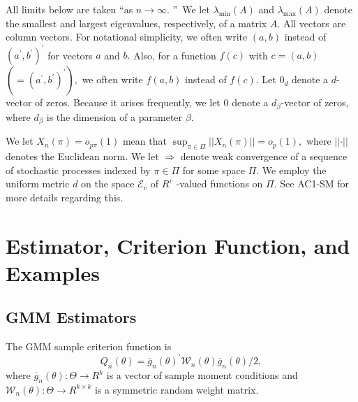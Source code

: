\documentclass[12pt,titlepage,final,oneside,letterpaper]{article}
\begin{document}
All limits below are taken \textquotedblleft as $n\rightarrow \infty .$%
\textquotedblright\ We let $\lambda _{\min }(A)$ and $\lambda _{\max }(A)$
denote the smallest and largest eigenvalues, respectively, of a matrix $A.$
All vectors are column vectors. For notational simplicity, we often write $%
(a,b)$ instead of $(a^{\prime },b^{\prime })^{\prime }$ for vectors $a$ and $%
b.$ Also, for a function $f(c)$ with $c=(a,b)$ $(=(a^{\prime },b^{\prime
})^{\prime }),$ we often write $f(a,b)$ instead of $f(c).$ Let $0_{d}$
denote a $d$-vector of zeros. Because it arises frequently, we let $0$
denote a $d_{\beta }$-vector of zeros, where $d_{\beta }$ is the dimension
of a parameter $\beta .$

We let $X_{n}(\pi )=o_{p\pi }(1)$ mean that $\sup_{\pi \in \Pi }\allowbreak
\left\vert \left\vert X_{n}(\pi )\right\vert \right\vert =o_{p}(1),$ where $%
\left\vert \left\vert \cdot \right\vert \right\vert $ denotes the Euclidean
norm. We let $\Rightarrow $ denote weak convergence of a sequence of
stochastic processes indexed by $\pi \in \Pi $ for some space $\Pi .$ We
employ the uniform metric $d$ on the space $\mathcal{E}_{v}$ of $R^{v}$%
-valued functions on $\Pi .$ See AC1-SM for more details regarding this.

\section{Estimator, Criterion Function, and Examples} \label{Estimator & Crit Fn Sec}

\subsection{GMM Estimators \label{Extremum Estrs Subsec}}

\setcounter{equation}{0}\hspace{0.25in}The GMM sample criterion function is%
\begin{equation}
Q_{n}(\theta )=\overline{g}_{n}(\theta )^{\prime }\mathcal{W}_{n}(\theta )%
\overline{g}_{n}(\theta )/2,  \label{GMM CF}
\end{equation}%
where $\overline{g}_{n}(\theta ):\Theta \rightarrow R^{k}$ is a vector of
sample moment conditions and $\mathcal{W}_{n}(\theta ):\Theta \rightarrow
R^{k\times k}$ is a symmetric random weight matrix.
\end{document}
